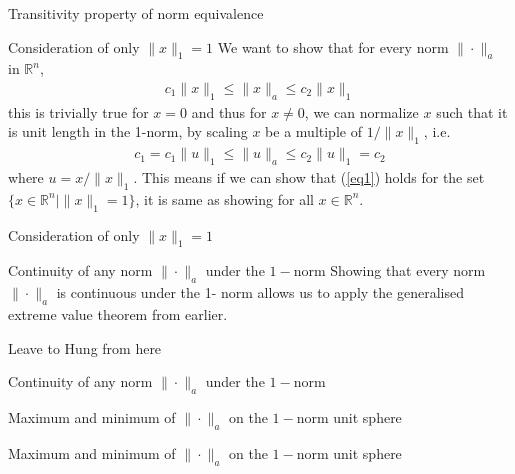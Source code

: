 \documentclass[10pt,appendixnumberbeamer]{beamer}
\begin{document}
\begin{frame}{Transitivity property of norm equivalence}

\end{frame}

\begin{frame}{Consideration of only $\|x\|_1 = 1$}
We want to show that for every norm $\|\cdot\|_a$ in $\mathbb{R}^n$,
\begin{align*}
c_1\|x\|_1 \leq \|x\|_a \leq c_2\|x\|_1
\end{align*}
this is trivially true for $x=0$ and thus for $x \neq 0$, we can normalize $x$ such that it is unit length in the 1-norm, by scaling $x$ be a multiple of $1/\|x\|_1$, i.e.
\begin{align}
c_1 = c_1 \|u\|_1\leq \|u\|_a\leq c_2 \|u\|_1 = c_2 \label{eq1}
\end{align}
where $u = x/ \|x\|_1$. This means if we can show that (\ref{eq1}) holds for the set $\{x \in \mathbb{R}^n|\|x\|_1=1\}$, it is same as showing for all $x \in \mathbb{R}^n$.
\end{frame}

\begin{frame}{Consideration of only $\|x\|_1 = 1$}

\end{frame}


\begin{frame}{Continuity of any norm $\|\cdot\|_a$ under the $1-$norm}
Showing that every norm $\|\cdot\|_a$ is continuous under the 1- norm allows us to apply the generalised extreme value theorem from earlier. 

{\color{red}Leave to Hung from here}

\end{frame}

\begin{frame}{Continuity of any norm $\|\cdot\|_a$ under the $1-$norm}

\end{frame}


\begin{frame}{Maximum and minimum of $\|\cdot\|_a$ on the $1-$norm unit sphere}

\end{frame}

\begin{frame}{Maximum and minimum of $\|\cdot\|_a$ on the $1-$norm unit sphere}

\end{frame}
\end{document}
